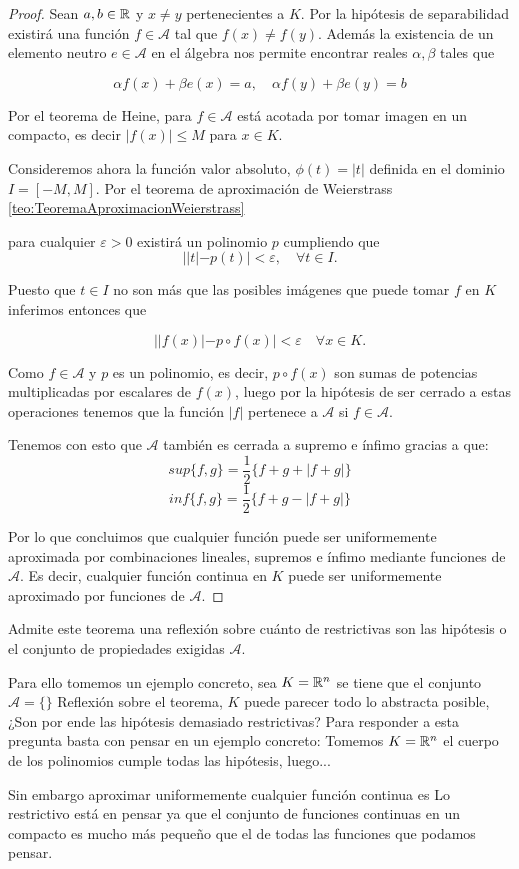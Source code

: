 \begin{proof}
    Sean $a, b \in \mathbb{R}$ y $x \neq y$ pertenecientes a $K$.  Por la hipótesis de separabilidad existirá 
    una función $f \in \mathcal{A}$ tal que $f(x) \neq f(y)$.  Además la existencia de un elemento neutro 
    $e \in \mathcal{A}$ en el álgebra nos permite encontrar reales $\alpha, \beta$ tales que 

    $$\alpha f(x) + \beta e(x) = a, \quad \alpha f(y) + \beta e(y) = b$$  

     Por el teorema de Heine, para $f \in \mathcal A$ está acotada por tomar imagen en un compacto, es decir $|f(x)| \leq M$ para $x \in K.$  

    Consideremos ahora la función valor absoluto, $\phi(t)=|t|$ definida en el dominio $I = [-M, M].$
    Por el teorema de aproximación de Weierstrass 
    \ref{teo:TeoremaAproximacionWeierstrass}
    
    para cualquier $\varepsilon > 0$ 
    existirá un polinomio $p$ cumpliendo que 
    $$||t|- p(t)| < \varepsilon, \quad \forall t \in I.$$

    Puesto que $t \in I$ no son más que las posibles imágenes que puede tomar $f$ en $K$ inferimos entonces que 

    $$||f(x)| - p \circ f(x)| < \varepsilon \quad \forall x \in K.$$

    Como $f \in \mathcal{A}$ y $p$ es un polinomio, es decir,  $p \circ f(x)$ son sumas de potencias multiplicadas por escalares de $f(x)$, luego por la hipótesis de ser cerrado a estas operaciones tenemos que la función 
    $|f|$ pertenece a $\mathcal{A}$ si $f \in \mathcal{A}.$  


    Tenemos con esto que $\mathcal{A}$ también es cerrada a supremo e ínfimo  gracias a que:   
    $$sup\{f,g\} = \frac{1}{2} \{f+g+ |f+g|\}$$
    $$inf\{f,g\} = \frac{1}{2} \{f+g -|f+g|\}$$
    
    Por lo que concluimos que cualquier función puede ser uniformemente aproximada por combinaciones lineales, supremos e ínfimo mediante funciones de $\mathcal{A}$.   Es decir, cualquier función continua en $K$
    puede ser uniformemente aproximado por funciones de $\mathcal{A}$. 
\end{proof}

Admite este teorema una reflexión sobre cuánto de restrictivas son las hipótesis
 o el conjunto de propiedades exigidas $\mathcal{A}$. 

Para ello tomemos un ejemplo concreto, sea $K =  \mathbb{R}^n$ se tiene que el conjunto 
$\mathcal{ A} = \{ \}$
Reflexión sobre el teorema, $K$ puede parecer todo lo abstracta posible, ¿Son por ende las 
hipótesis demasiado restrictivas?  Para responder a esta pregunta basta con pensar en un ejemplo concreto: 
Tomemos $K =  \mathbb{R}^n$  el cuerpo de los polinomios cumple todas las hipótesis, luego... 

Sin embargo aproximar uniformemente cualquier función continua es 
Lo restrictivo está en pensar ya que el conjunto de funciones continuas en un compacto es mucho  más pequeño que el de todas las funciones que podamos pensar.  

\endinput